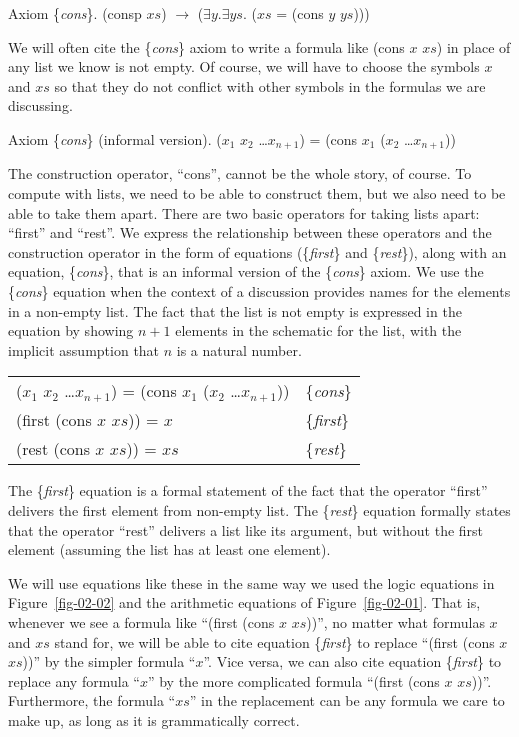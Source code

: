 \label{cons-axiom-formal}
Axiom \{\emph{cons}\}. (consp $xs$) $\rightarrow$ ($\exists y. \exists ys.$ ($xs$ = (cons $y$ $ys$)))

We will often cite the \{\emph{cons}\} axiom to write a formula like (cons $x$ $xs$) in place of any list we know is not empty. Of course, we will have to choose the symbols $x$ and $xs$ so that they do not conflict with other symbols in the formulas we are discussing.

\label{cons-axiom-informal}
Axiom \{\emph{cons}\} (informal version).
($x_1$ $x_2$ \dots $x_{n+1}$) = (cons $x_1$ ($x_2$ \dots $x_{n+1}$))

The construction operator, ``cons'', cannot be the whole story, of course. To compute with lists, we  need to be able to construct them, but we also need to be able to take them apart. There are two basic operators for taking lists apart: ``first'' and ``rest''. We express the relationship between these operators and the construction operator in the form of equations (\{\emph{first}\} and \{\emph{rest}\}), along with an equation, \{\emph{cons}\}, that is an informal version of the \{\emph{cons}\} axiom. We use the \{\emph{cons}\} equation when the context of a discussion provides names for the elements in a non-empty list. The fact that the list is not empty is expressed in the equation by showing $n+1$ elements in the schematic for the list, with the implicit assumption that $n$ is a natural number.

\label{first-rest-cons}
\begin{tabular}{ll}
 ($x_1$ $x_2$ \dots $x_{n+1}$) = (cons $x_1$ ($x_2$ \dots $x_{n+1}$)) & \{\emph{cons}\} \\
 (first (cons $x$ $xs$)) = $x$                                        & \{\emph{first}\}\\
 (rest (cons $x$ $xs$))  = $xs$                                       & \{\emph{rest}\} \\
\end{tabular}

The \{\emph{first}\} equation is a formal statement of the fact that the operator ``first'' delivers the first element from non-empty list. The \{\emph{rest}\} equation formally states that the operator ``rest'' delivers a list like its argument, but without the first element (assuming the list has at least one element).

We will use equations like these in the same way we used the logic equations in Figure~\ref{fig-02-02} and the arithmetic equations of Figure~\ref{fig-02-01}. That is, whenever we see a formula like ``(first (cons $x$ $xs$))'', no matter what formulas $x$ and $xs$ stand for, we will be able to cite equation \{\emph{first}\} to replace ``(first (cons $x$ $xs$))'' by the simpler formula ``$x$''. Vice versa, we can also cite equation \{\emph{first}\} to replace any formula ``$x$'' by the more complicated formula ``(first (cons $x$ $xs$))''. Furthermore, the formula ``$xs$'' in the replacement can be any formula we care to make up, as long as it is grammatically correct.

